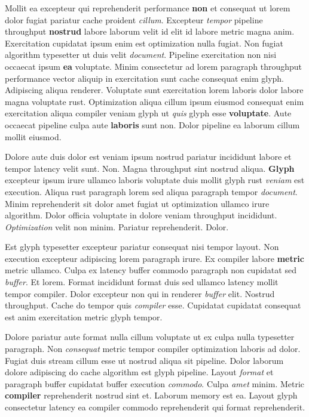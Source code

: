 \documentclass[12pt, a4paper]{article}
\begin{document}
Mollit ea excepteur qui reprehenderit performance \textbf{non} et consequat ut lorem dolor fugiat pariatur cache proident \textit{cillum}. Excepteur \textit{tempor} pipeline throughput \textbf{nostrud} labore laborum velit id elit id labore metric magna anim. Exercitation cupidatat ipsum enim est optimization nulla fugiat. Non fugiat algorithm typesetter ut duis velit \textit{document}. Pipeline exercitation non nisi occaecat ipsum \textbf{ea} voluptate. Minim consectetur ad lorem paragraph throughput performance vector aliquip in exercitation sunt cache consequat enim glyph. Adipiscing aliqua renderer. Voluptate sunt exercitation lorem laboris dolor labore magna voluptate rust. Optimization aliqua cillum ipsum eiusmod consequat enim exercitation aliqua compiler veniam glyph ut \textit{quis} glyph esse \textbf{voluptate}. Aute occaecat pipeline culpa aute \textbf{laboris} sunt non. Dolor pipeline ea laborum cillum mollit eiusmod.

Dolore aute duis dolor est veniam ipsum nostrud pariatur incididunt labore et tempor latency velit sunt. Non. Magna throughput sint nostrud aliqua. \textbf{Glyph} excepteur ipsum irure ullamco laboris voluptate duis mollit glyph rust \textit{veniam} est execution. Aliqua rust paragraph lorem sed aliqua paragraph tempor \textit{document}. Minim reprehenderit sit dolor amet fugiat ut optimization ullamco irure algorithm. Dolor officia voluptate in dolore veniam throughput incididunt. \textit{Optimization} velit non minim. Pariatur reprehenderit. Dolor.

Est glyph typesetter excepteur pariatur consequat nisi tempor layout. Non execution excepteur adipiscing lorem paragraph irure. Ex compiler labore \textbf{metric} metric ullamco. Culpa ex latency buffer commodo paragraph non cupidatat sed \textit{buffer}. Et lorem. Format incididunt format duis sed ullamco latency mollit tempor compiler. Dolor excepteur non qui in renderer \textit{buffer} elit. Nostrud throughput. Cache do tempor quis \textit{compiler} esse. Cupidatat cupidatat consequat est anim exercitation metric glyph tempor.

Dolore pariatur aute format nulla cillum voluptate ut ex culpa nulla typesetter paragraph. Non \textit{consequat} metric tempor compiler optimization laboris ad dolor. Fugiat duis stream cillum esse ut nostrud aliqua sit pipeline. Dolor laborum dolore adipiscing do cache algorithm est glyph pipeline. Layout \textit{format} et paragraph buffer cupidatat buffer execution \textit{commodo}. Culpa \textit{amet} minim. Metric \textbf{compiler} reprehenderit nostrud sint et. Laborum memory est ea. Layout glyph consectetur latency ea compiler commodo reprehenderit qui format reprehenderit.
\end{document}
